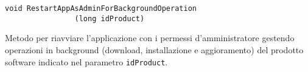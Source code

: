 \begin{tcolorbox}[fonttitle=\bfseries, 
								adjusted title={\Large AppRestarter}, 
								breakable, 
								sharp corners=south,
								colback=white, 
								colframe=white!60!black]
\begin{description}
						\begin{lstlisting}
void RestartAppAsAdminForBackgroundOperation
			    (long idProduct)
						\end{lstlisting}
						Metodo per riavviare l'applicazione con i permessi d'amministratore gestendo operazioni in background (download, installazione e aggioramento) del prodotto software indicato nel parametro \verb|idProduct|.  					
        				
				\end{description}  
				
			\end{tcolorbox}	